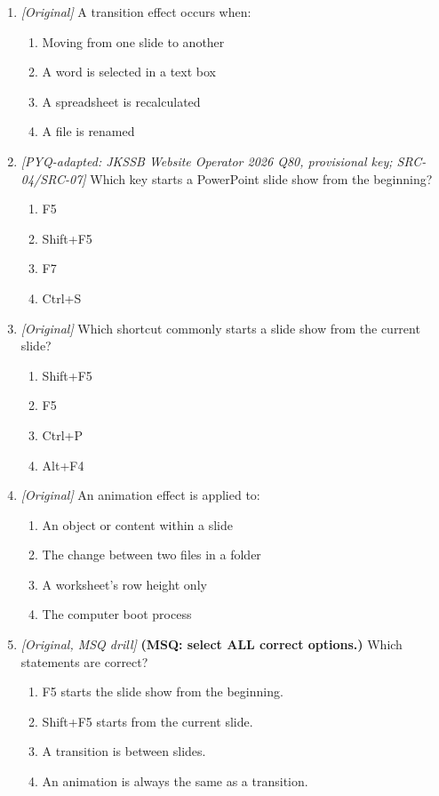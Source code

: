 \begin{enumerate}[label=\textbf{Q\arabic*.}, leftmargin=*]
\begin{enumerate}[label=\Alph*.]
    \item Animations print extra paper copies.
  \end{enumerate}
\item \textit{[Original]} A transition effect occurs when:
  \begin{enumerate}[label=\Alph*.]
\item Moving from one slide to another
   \item A word is selected in a text box
   \item A spreadsheet is recalculated
   \item A file is renamed
  \end{enumerate}

\item \textit{[PYQ-adapted: JKSSB Website Operator 2026 Q80, provisional key; SRC-04/SRC-07]} Which key starts a PowerPoint slide show from the beginning?
  \begin{enumerate}[label=\Alph*.]
\item F5
   \item Shift+F5
   \item F7
   \item Ctrl+S
  \end{enumerate}

\item \textit{[Original]} Which shortcut commonly starts a slide show from the current slide?
  \begin{enumerate}[label=\Alph*.]
\item Shift+F5
   \item F5
   \item Ctrl+P
   \item Alt+F4
  \end{enumerate}

\item \textit{[Original]} An animation effect is applied to:
  \begin{enumerate}[label=\Alph*.]
\item An object or content within a slide
   \item The change between two files in a folder
   \item A worksheet's row height only
   \item The computer boot process
  \end{enumerate}

\item \textit{[Original, MSQ drill]} \textbf{(MSQ: select ALL correct options.)} Which statements are correct?
  \begin{enumerate}[label=\Alph*.]
\item F5 starts the slide show from the beginning.
   \item Shift+F5 starts from the current slide.
   \item A transition is between slides.
   \item An animation is always the same as a transition.
  \end{enumerate}

\end{enumerate}
